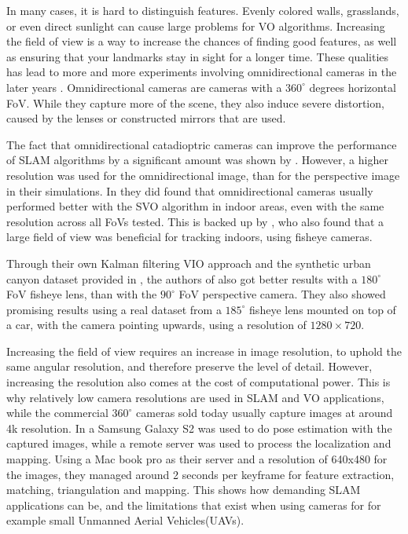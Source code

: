 In many cases, it is hard to distinguish features. Evenly colored walls, grasslands, or even direct sunlight can cause large problems for VO algorithms. Increasing the field of view is a way to increase the chances of finding good features, as well as ensuring that your landmarks stay in sight for a longer time. These qualities has lead to more and more experiments involving omnidirectional cameras in the later years \cite{CompOmniConvVSLAM, Zhang2016BenefitOL, OmniVIOKalman, OmniDenseSLAM}. Omnidirectional cameras are cameras with a $360^\circ$ degrees horizontal FoV. While they capture more of the scene, they also induce severe distortion, caused by the lenses or constructed mirrors that are used.

The fact that omnidirectional catadioptric cameras can improve the performance of SLAM algorithms by a significant amount was shown by \cite{CompOmniConvVSLAM}. However, a higher resolution was used for the omnidirectional image, than for the perspective image in their simulations. In \cite{Zhang2016BenefitOL} they did found that omnidirectional cameras usually performed better with the SVO algorithm in indoor areas, even with the same resolution across all FoVs tested. This is backed up by \cite{OMNIChooseLensVisual}, who also found that a large field of view was beneficial for tracking indoors, using fisheye cameras. 

Through their own Kalman filtering VIO approach and the synthetic urban canyon dataset provided in \cite{Zhang2016BenefitOL}, the authors of \cite{OmniVIOKalman} also got better results with a $180^\circ$ FoV fisheye lens, than with the $90^\circ$ FoV perspective camera. They also showed promising results using a real dataset from a $185^\circ$ fisheye lens mounted on top of a car, with the camera pointing upwards, using a resolution of $1280 \times 720$.

Increasing the field of view requires an increase in image resolution, to uphold the same angular resolution, and therefore preserve the level of detail. However, increasing the resolution also comes at the cost of computational power. This is why relatively low camera resolutions are used in SLAM and VO applications, while the commercial $360^\circ$ cameras sold today usually capture images at around 4k resolution. In \cite{MobileSLAM} a Samsung Galaxy S2 was used to do pose estimation with the captured images, while a remote server was used to process the localization and mapping. Using a Mac book pro as their server and a resolution of 640x480 for the images, they managed around 2 seconds per keyframe for feature extraction, matching, triangulation and mapping. This shows how demanding SLAM applications can be, and the limitations that exist when using cameras for for example small Unmanned Aerial Vehicles(UAVs). 

